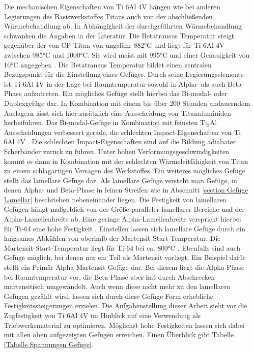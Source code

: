 \documentclass[a4paper, 11pt]{tubsreprt}
\begin{document}
Die mechanischen Eigenschaften von Ti 6Al 4V hängen wie bei anderen Legierungen des Basiswerkstoffes Titans auch von der abschließenden Wärmebehandlung ab. In Abhängigkeit der durchgeführten Wärmebehandlung schwanken die Angaben in der Literatur. Die Betatransus Temperatur steigt gegenüber der von CP-Titan von ungefähr 882°C \cite[s. 23]{Luetjering2007} und liegt für Ti 6Al 4V zwischen 985°C und 1000°C. Sie wird meist mit 995°C und einer Genauigkeit von 10°C angegeben \cite{Semiatin2003}\cite{Chen2008}. Die Betatransus Temperatur bildet einen zentralen Bezugspunkt für die Einstellung eines Gefüges. Durch seine Legierungselemente ist Ti 6Al 4V in der Lage bei Raumtemperatur sowohl in Alpha- als auch Beta-Phase aufzutreten.
Ein mögliches Gefüge stellt hierbei das Bi-modal- oder Duplexgefüge dar. In Kombination mit einem bis über 200 Stunden andauerndem Auslagern lässt sich hier zusätzlich eine Ausscheidung von Titanaluminiden  herbeiführen. Das Bi-modal-Gefüge in Kombination mit feinsten Ti$_{3}$Al Ausscheidungen verbessert gerade, die schlechten Impact-Eigenschaften von Ti 6Al 4V \cite{Lee2005}. Die schlechten Impact-Eigenschaften sind auf die Bildung adiabater Scherbänder zurück zu führen. Unter hohen Verformungsgeschwindigkeiten kommt es dann in Kombination mit der schlechten Wärmeleitfähigkeit von Titan zu einem schlagartigen Versagen des Werkstoffes.
Ein weiteres mögliches Gefüge stellt das lamellare Gefüge dar. Als lamellare Gefüge versteht man Gefüge, in denen Alpha- und Beta-Phase in feinen Streifen wie in Abschnitt \ref{section Gefüge Lamellar} beschrieben nebeneinander liegen. Die Festigkeit von lamellaren Gefügen hängt maßgeblich von der Größe paralleler lamellarer Bereiche und der Alpha-Lamellenbreite ab. Eine geringe Alpha-Lamellenbreite verspricht hierbei für Ti-64 eine hohe Festigkeit \cite{Sieniawski2013}. Einstellen lassen sich lamellare Gefüge durch ein langsames Abkühlen von oberhalb der Martensit Start-Temperatur. Die Martensit-Start-Temperatur liegt für Ti-64 bei ca. 800°C \cite{Boyer1994}. Ebenfalls sind auch Gefüge möglich, bei denen nur ein Teil als Martensit vorliegt. Ein Beispiel dafür stellt ein Primär Alpha Martensit Gefüge dar. Bei diesem liegt die Alpha-Phase bei Raumtemperatur vor, die Beta-Phase aber hat durch Abschrecken martensitisch umgewandelt. Auch wenn diese nicht mehr zu den lamellaren Gefügen gezählt wird, lassen sich durch diese Gefüge Form erhebliche Festigkeitssteigerungen erzielen. Die Aufgabenstellung dieser Arbeit sieht vor die Zugfestigkeit von Ti 6Al 4V im Hinblick auf eine Verwendung als Triebwerksmaterial zu optimieren. Möglichst hohe Festigkeiten lassen sich dabei mit allen oben aufgezeigten Gefügen erreichen. Einen Überblick gibt Tabelle \ref{Tabelle Spannungen Gefüge}.
\end{document}

